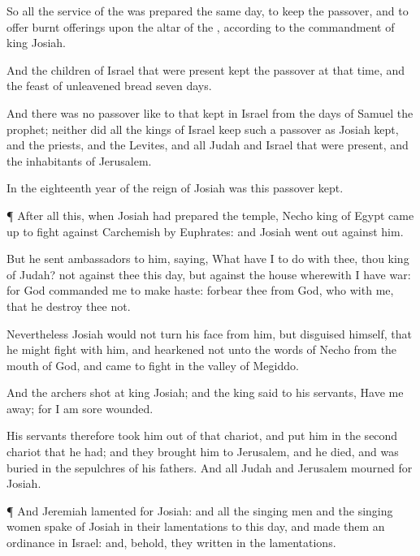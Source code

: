 {So all the
service of the
{} was
prepared the same
day, to
keep the
passover, and to
offer burnt
offerings upon the
altar of the
{}, according to the
commandment of
king
Josiah.

And the
children of
Israel that were
present
kept the
passover at that
time, and the
feast of unleavened
bread
seven
days.

And there was no
passover
like to that
kept in
Israel from the
days of
Samuel the
prophet; neither
did all the
kings of
Israel
keep such a
passover as
Josiah
kept, and the
priests, and the
Levites, and all
Judah and
Israel that were
present, and the
inhabitants of
Jerusalem.

In the
eighteenth
year of the
reign of
Josiah was this
passover
kept.


\par }{\PP {}¶
After all this, when
Josiah had
prepared the
temple,
Necho
king of
Egypt came
up to
fight against
Carchemish by
Euphrates: and
Josiah went
out
against him.

But he
sent
ambassadors to him,
saying, What have I to do with thee, thou
king of
Judah?
{} not against thee this
day, but against the
house wherewith I have
war: for
God
commanded me to make
haste:
forbear thee from
{}
God, who
{} with me, that he
destroy thee not.

Nevertheless
Josiah would not
turn his
face from him, but
disguised himself, that he might
fight with him, and
hearkened not unto the
words of
Necho from the
mouth of
God, and
came to
fight in the
valley of
Megiddo.

And the
archers
shot at
king
Josiah; and the
king
said to his
servants, Have me
away; for I am
sore
wounded.

His
servants therefore
took him out of that
chariot, and
put him in the
second
chariot that he had; and they
brought him to
Jerusalem, and he
died, and was
buried in
{} the
sepulchres of his
fathers. And all
Judah and
Jerusalem
mourned for
Josiah.


\par }{\PP {}¶ And
Jeremiah
lamented for
Josiah: and all the singing
men and the singing
women
spake of
Josiah in their
lamentations to this
day, and
made them an
ordinance in
Israel: and, behold, they
{}
written in the
lamentations.

}
